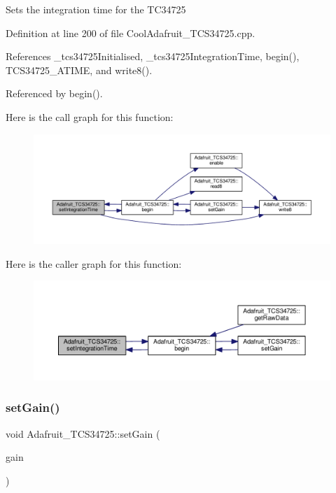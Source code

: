 Sets the integration time for the T\+C34725 

Definition at line 200 of file Cool\+Adafruit\+\_\+\+T\+C\+S34725.\+cpp.



References \+\_\+tcs34725\+Initialised, \+\_\+tcs34725\+Integration\+Time, begin(), T\+C\+S34725\+\_\+\+A\+T\+I\+ME, and write8().



Referenced by begin().

Here is the call graph for this function\+:
\nopagebreak
\begin{figure}[H]
\begin{center}
\leavevmode
\includegraphics[width=350pt]{df/d54/class_adafruit___t_c_s34725_a3c89fe5d4eea1f24f31d1afa9de8f0f3_cgraph}
\end{center}
\end{figure}
Here is the caller graph for this function\+:
\nopagebreak
\begin{figure}[H]
\begin{center}
\leavevmode
\includegraphics[width=350pt]{df/d54/class_adafruit___t_c_s34725_a3c89fe5d4eea1f24f31d1afa9de8f0f3_icgraph}
\end{center}
\end{figure}
\mbox{\label{class_adafruit___t_c_s34725_a6be06315a9d33f76e44550f574f023a5}} 
\subsubsection{\texorpdfstring{set\+Gain()}{setGain()}}
{\footnotesize\ttfamily void Adafruit\+\_\+\+T\+C\+S34725\+::set\+Gain (\begin{DoxyParamCaption}\item[{\hyperlink{_cool_adafruit___t_c_s34725_8h_a23611ba111ac38012551332ee7189f9a}{tcs34725\+Gain\+\_\+t}}]{gain }\end{DoxyParamCaption})}

